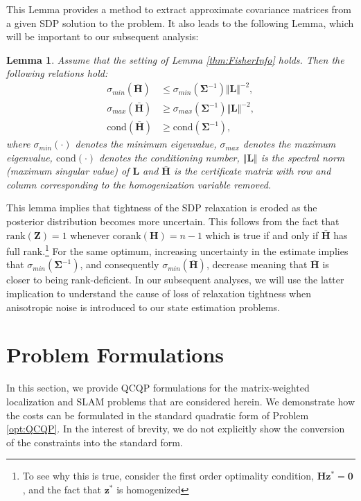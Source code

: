 \documentclass[lettersize,journal]{IEEEtran}
\newtheorem{lemma}[theorem]{Lemma}
\begin{document}
{This Lemma provides a method to extract approximate covariance matrices from a given SDP solution to the problem. It also leads to the following Lemma, which will be important to our subsequent analysis:
\begin{lemma}\label{thm:eig_bounds}
	Assume that the setting of Lemma \ref{thm:FisherInfo} holds. Then the following relations hold:
	\begin{align}
		\sigma_{min}(\bar{\bm{H}})  &\leq \sigma_{min}(\bm{\Sigma}^{-1})\Vert \bm{L} \Vert^{-2}, \\
		\sigma_{max}(\bar{\bm{H}})  &\geq \sigma_{max}(\bm{\Sigma}^{-1})\Vert \bm{L} \Vert^{-2}, \\
		\mbox{cond}(\bar{\bm{H}}) &\geq \mbox{cond}(\bm{\Sigma}^{-1}),
	\end{align}
	where $\sigma_{min}(\cdot)$ denotes the minimum eigenvalue, $\sigma_{max}$ denotes the maximum eigenvalue, $\mbox{cond}(\cdot)$ denotes the conditioning number, $\Vert \bm{L} \Vert$ is the spectral norm (maximum singular value) of $\bm{L}$ and $\bar{\bm{H}}$ is the certificate matrix with row and column corresponding to the homogenization variable removed.
\end{lemma}

This lemma implies that tightness of the SDP relaxation is eroded as the posterior distribution becomes more uncertain. This follows from the fact that $\mbox{rank}(\bm{Z})=1$ whenever $\mbox{corank}(\bm{H})=n-1$ which is true if and only if $\bar{\bm{H}}$ has full rank.\footnote{To see why this is true, consider the first order optimality condition, $\bm{H}\bm{z}^*=\bm{0}$, and the fact that $\bm{z}^*$ is homogenized} For the same optimum, increasing uncertainty in the estimate implies that $\sigma_{min}(\bm{\Sigma}^{-1})$, and consequently $\sigma_{min}(\bar{\bm{H}})$, decrease meaning that $\bar{\bm{H}}$ is closer to being rank-deficient.  In our subsequent analyses, we will use the latter implication to understand the cause of loss of relaxation tightness when anisotropic noise is introduced to our state estimation problems. 
}

\section{Problem Formulations}\label{sec:Formulations}

In this section, we provide QCQP formulations for the matrix-weighted localization and SLAM problems that are considered herein. We demonstrate how the costs can be formulated in the standard quadratic form of Problem \eqref{opt:QCQP}. In the interest of brevity, we do not explicitly show the conversion of the constraints into the standard form.
\end{document}
